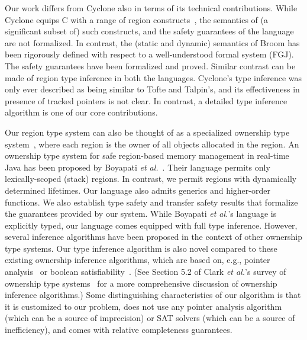 Our work differs from Cyclone also in terms of its technical
contributions. While Cyclone equips C with a range of region
constructs~\cite{cycloneSCP}, the semantics of (a significant subset
of) such constructs, and the safety guarantees of the language are not
formalized. In contrast, the (static and dynamic) semantics of Broom
has been rigorously defined with respect to a well-understood formal
system (FGJ). The safety guarantees have been formalized and proved.
Similar contrast can be made of region type inference in both the languages.
Cyclone's type inference was only ever described as being similar to
Tofte and Talpin's, and its effectiveness in presence of tracked
pointers is not clear.
In contrast, a detailed type inference algorithm is one of our core contributions.

Our region type system can also be thought of as a specialized
ownership type system~\cite{OwnershipSurvey}, where each region is the
owner of all objects allocated in the region.
%
An ownership type system for safe region-based memory management in
real-time Java has been proposed by Boyapati \emph{et al.}~\cite{MIT03}.  
Their language permits only lexically-scoped (stack) regions.
In contrast, we permit regions with dynamically determined lifetimes.
Our language also admits generics and higher-order functions.  We also
establish type safety and transfer safety results that formalize the
guarantees provided by our system. While Boyapati \emph{et al.}'s
language is explicitly typed, our language comes equipped with full
type inference.  However, several inference algorithms have been
proposed in the context of other ownership type systems.  Our type
inference algorithm is also novel compared to these existing ownership
inference algorithms, which are based on, e.g., pointer
analysis~\cite{HuangEtAl:ECOOP12} or boolean
satisfiability~\cite{DietlEtAl:ECOOP11}.  (See Section 5.2 of Clark
\emph{et al.}'s survey of ownership type
systems~\cite{OwnershipSurvey} for a more comprehensive discussion of
ownership inference algorithms.) Some distinguishing characteristics
of our algorithm is that it is customized to our problem, does not use
any pointer analysis algorithm (which can be a source of imprecision)
or SAT solvers (which can be a source of inefficiency), and comes with
relative completeness guarantees.


